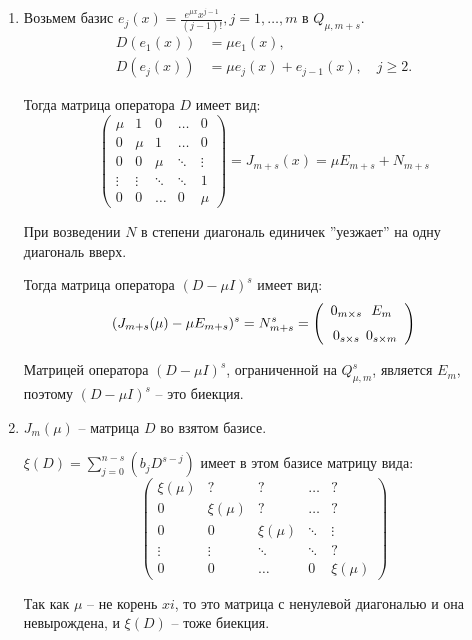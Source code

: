 \begin{enumerate}
    \item Возьмем базис $e_j(x) = \frac{e^{\mu x} x^{j-1}}{(j-1)!}, j=1, \dots, m $ в $Q_{\mu, m+s}$.
    \begin{align*}
        D(e_1(x)) &= \mu e_1(x),\\
        D(e_j(x)) &= \mu e_j(x) + e_{j-1}(x), \quad j \geq 2.
    \end{align*}

    Тогда матрица оператора $D$ имеет вид:
    \begin{equation*}
        \begin{pmatrix}
            \mu & 1   & 0   & \dots & 0 \\
            0   & \mu & 1   & \dots & 0 \\
            0   & 0   & \mu & \ddots & \vdots \\
            \vdots & \vdots & \ddots & \ddots & 1 \\
            0   & 0   & \dots & 0 & \mu
        \end{pmatrix}
        = J_{m+s}(x) = \mu E_{m+s} + N_{m+s}
    \end{equation*}

    При возведении $N$ в степени диагональ единичек ''уезжает'' на одну диагональ вверх.

    Тогда матрица оператора $(D - \mu I)^s$ имеет вид:
    \begin{equation*}
        (J_{m+s}(\mu) - \mu E_{m+s})^s = N_{m+s}^s =
        \left(
            \begin{array}{c@{\;}c}
                0_{m\times s} & E_m \\[6pt]
                0_{s\times s} & 0_{s\times m}
            \end{array}
        \right)
    \end{equation*}

    Матрицей оператора $(D-\mu I)^s$, ограниченной на $Q_{\mu, m}^s$, является $E_m$, поэтому $(D-\mu I)^s$ -- это биекция.

    \item $J_m(\mu)$ -- матрица $D$ во взятом базисе.

    $\xi(D)=\sum_{j=0}^{n-s}(b_j D^{s-j})$ имеет в этом базисе матрицу вида:
    \begin{equation*}
        \begin{pmatrix}
            \xi(\mu) & ? & ?  & \dots & ? \\
            0   & \xi(\mu) & ?   & \dots & ? \\
            0   & 0   & \xi(\mu) & \ddots & \vdots \\
            \vdots & \vdots & \ddots & \ddots & ? \\
            0   & 0   & \dots & 0 & \xi(\mu)
        \end{pmatrix}
    \end{equation*}

    Так как $\mu$ -- не корень $xi$, то это матрица с ненулевой диагональю и она невырождена, и $\xi(D)$ -- тоже биекция.
\end{enumerate}

\Endproof